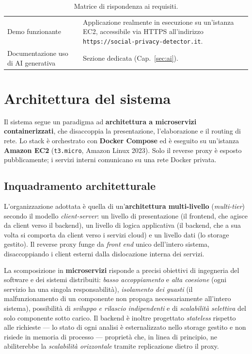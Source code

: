 \documentclass[11pt,a4paper]{article}
\begin{document}
\begin{table}[htbp]
\begin{tabular}{p{6.2cm} p{8.2cm}}
Demo funzionante & Applicazione realmente in esecuzione su un'istanza EC2, accessibile via HTTPS all'indirizzo \texttt{https://social-privacy-detector.it}. \\
Documentazione uso di AI generativa & Sezione dedicata (Cap.~\ref{sec:ai}). \\
\bottomrule
\end{tabular}
\caption{Matrice di rispondenza ai requisiti.}
\label{tab:req}
\end{table}

\section{Architettura del sistema}
Il sistema segue un paradigma ad \textbf{architettura a microservizi
containerizzati}, che disaccoppia la presentazione, l'elaborazione e il routing di
rete. Lo stack è orchestrato con \textbf{Docker Compose} ed è eseguito su un'istanza
\textbf{Amazon EC2} (\texttt{t3.micro}, Amazon Linux 2023). Solo il reverse proxy è
esposto pubblicamente; i servizi interni comunicano su una rete Docker privata.

\subsection{Inquadramento architetturale}
L'organizzazione adottata è quella di un'\textbf{architettura multi-livello}
(\emph{multi-tier}) secondo il modello \emph{client-server}: un livello di
presentazione (il frontend, che agisce da client verso il backend), un livello di
logica applicativa (il backend, che a sua volta si comporta da client verso i servizi
cloud) e un livello dati (lo storage gestito). Il reverse proxy funge da \emph{front
end} unico dell'intero sistema, disaccoppiando i client esterni dalla dislocazione
interna dei servizi.

La scomposizione in \textbf{microservizi} risponde a precisi obiettivi di ingegneria
del software e dei sistemi distribuiti: \emph{basso accoppiamento} e \emph{alta
coesione} (ogni servizio ha una singola responsabilità), \emph{isolamento dei guasti}
(il malfunzionamento di un componente non propaga necessariamente all'intero sistema),
possibilità di \emph{sviluppo e rilascio indipendenti} e di \emph{scalabilità
selettiva} del solo componente sotto carico. Il backend è inoltre progettato
\emph{stateless} rispetto alle richieste --- lo stato di ogni analisi è esternalizzato
nello storage gestito e non risiede in memoria di processo --- proprietà che, in linea
di principio, ne abiliterebbe la \emph{scalabilità orizzontale} tramite replicazione
dietro il proxy.
\end{document}
